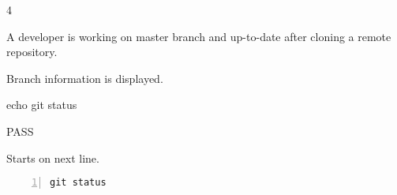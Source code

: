 \begin{description}[align=right,leftmargin=3.2cm,labelindent=3.0cm]
\item[Step:] 4
\item[Confirm:] A developer is working on master branch and up-to-date after cloning a remote repository.
\item[Expectation:] Branch information is displayed.
\item[Command:] echo git  status
\item[Test Result:] PASS
\item[Evidence:] Starts on next line.
\end{description}
\begin{lstlisting}[numbers=left]
git status

\end{lstlisting}
